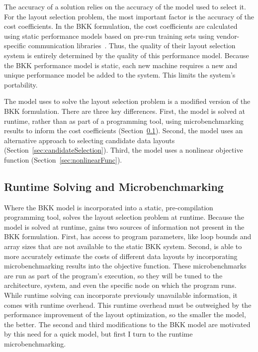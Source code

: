 The accuracy of a solution relies on the accuracy of the model used to select it.
For the layout selection problem, the most important factor is the accuracy of the cost coefficients.
In the BKK formulation, the cost coefficients are calculated using static performance models based on pre-run training sets using vendor-specific communication libraries~\cite{kremer1996automatic}.
Thus, the quality of their layout selection system is entirely determined by the quality of this performance model.
Because the BKK performance model is static, each new machine requires a new and unique performance model be added to the system.
This limits the system's portability.

The model \FormatDecisions{} uses to solve the layout selection problem is a modified version of the BKK formulation.
There are three key differences.
First, the model is solved at runtime, rather than as part of a programming tool, using microbenchmarking results to inform the cost coefficients (Section~\ref{sec:microbenchmarking}).
Second, the model uses an alternative approach to selecting candidate data layouts (Section~\ref{sec:candidateSelection}).
Third, the model uses a nonlinear objective function (Section~\ref{sec:nonlinearFunc}).

\subsection{Runtime Solving and Microbenchmarking}\label{sec:microbenchmarking}

Where the BKK model is incorporated into a static, pre-compilation programming tool, \FormatDecisions{} solves the layout selection problem at runtime.
Because the model is solved at runtime, \FormatDecisions{} gains two sources of information not present in the BKK formulation.
First, \FormatDecisions{} has access to program parameters, like loop bounds and array sizes that are not available to the static BKK system.
Second, \FormatDecisions{} is able to more accurately estimate the costs of different data layouts by incorporating microbenchmarking results into the objective function.
These microbenchmarks are run as part of the program's execution, so they will be tuned to the architecture, system, and even the specific node on which the program runs.
While runtime solving can incorporate previously unavailable information, it comes with runtime overhead.
This runtime overhead must be outweighed by the performance improvement of the layout optimization, so the smaller the model, the better.
The second and third modifications to the BKK model are motivated by this need for a quick model, but first I turn to the runtime microbenchmarking.

